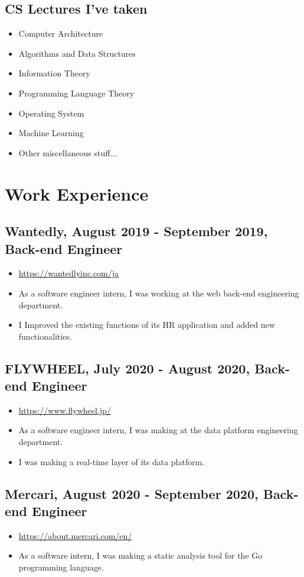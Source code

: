 \documentclass{article}
\begin{document}
  \subsection*{CS Lectures I've taken}
    \begin{itemize}
      \item Computer Architecture
      \item Algorithms and Data Structures
      \item Information Theory
      \item Programming Language Theory
      \item Operating System
      \item Machine Learning
      \item Other miscellaneous stuff...
    \end{itemize}

\section*{Work Experience}
  \subsection*{Wantedly, August 2019 - September 2019, Back-end Engineer}
    \begin{itemize}
      \item \url{https://wantedlyinc.com/ja}
      \item As a software engineer intern, I was working at the web back-end engineering department.
      \item I Improved the existing functions of its HR application and added new functionalities.
    \end{itemize}

  \subsection*{FLYWHEEL, July 2020 - August 2020, Back-end Engineer}
    \begin{itemize}
      \item \url{https://www.flywheel.jp/}
      \item As a software engineer intern, I was making at the data platform engineering department.
      \item I was making a real-time layer of its data platform.
    \end{itemize}

  \subsection*{Mercari, August 2020 - September 2020, Back-end Engineer}
    \begin{itemize}
      \item \url{https://about.mercari.com/en/}
      \item As a software intern, I was making a static analysis tool for the Go programming language.
    \end{itemize}
\end{document}
